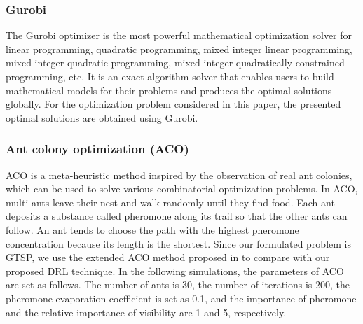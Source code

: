 \documentclass[journal]{IEEEtran}
\begin{document}
\subsubsection{Gurobi}

The Gurobi optimizer is the most powerful mathematical optimization solver for linear programming, quadratic programming, mixed integer linear programming, mixed-integer quadratic programming, mixed-integer quadratically constrained programming, etc\cite{gurobi}. It is an exact algorithm solver that enables users to build mathematical models for their problems and produces the optimal solutions globally. For the optimization problem considered in this paper, the presented optimal solutions are obtained using Gurobi.


\subsubsection{{Ant colony optimization (ACO)}}
{ACO is a meta-heuristic method inspired by the observation of real ant colonies, which can be used to solve various combinatorial optimization problems. In ACO, multi-ants leave their nest and walk randomly until they find food. Each ant deposits a substance called pheromone along its trail so that the other ants can follow. An ant tends to choose the path with the highest pheromone concentration because its length is the shortest. Since our formulated problem is GTSP, we use the extended ACO method proposed in \cite{J. Yang} to compare with our proposed DRL technique. In the following simulations, the parameters of ACO are set as follows. The number of ants is 30, the number of iterations is 200, the pheromone evaporation coefficient is set as 0.1, and the importance of pheromone and the relative importance of visibility are 1 and 5, respectively. }
\end{document}
